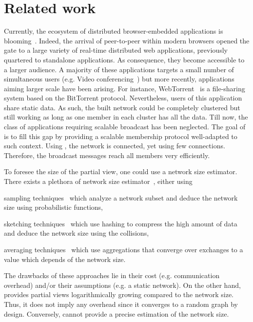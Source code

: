 
\section{Related work}
\label{sec:relatedwork}

Currently, the ecosystem of distributed browser-embedded applications is
blooming~\cite{firefoxhello,sharefest,webtorrent}. Indeed, the arrival of
peer-to-peer within modern browsers opened the gate to a large variety of
real-time distributed web applications, previously quartered to standalone
applications. As consequence, they become accessible to a larger audience. A
majority of these applications targets a small number of simultaneous users
(e.g. Video conferencing~\cite{firefoxhello}) but more recently, applications
aiming larger scale have been arising. For instance,
WebTorrent~\cite{webtorrent} is a file-sharing system based on the BitTorrent
protocol. Nevertheless, users of this application share static data. As such,
the built network could be completely clustered but still working as long as
one member in each cluster has all the data.  Till now, the class of
applications requiring scalable broadcast has been neglected. The goal of
\SCAMPLON{} is to fill this gap by providing a scalable membership protocol
well-adapted to such context. Using \SCAMPLON{}, the network is connected, yet
using few connections. Therefore, the broadcast messages reach all members very
efficiently.

To foresee the size of the partial view, one could use a network size
estimator. There exists a plethora of network size
estimator~\cite{jelasity2004epidemic, ganesh2007peer, kostoulas2007active,
  baquero2012extrema}, either using
\begin{inparaenum}[(i)]
\item sampling techniques~\cite{mane05network, ganesh2007peer,
    kostoulas2007active} which analyze a network subset and deduce the network
  size using probabilistic functions,
\item sketching techniques~\cite{baquero2012extrema} which use hashing to
  compress the high amount of data and deduce the network size using the
  collisions,
\item averaging techniques~\cite{jelasity2004epidemic} which use aggregations
  that converge over exchanges to a value which depends of the network size.
\end{inparaenum}
The drawbacks of these approaches lie in their cost (e.g. communication
overhead) and/or their assumptions (e.g. a static network). On the other hand,
\SCAMPLON{} provides partial views logarithmically growing compared to the
network size. Thus, it does not imply any overhead since it converges to a
random graph by design. Conversely, \SCAMPLON{} cannot provide a precise
estimation of the network size.

